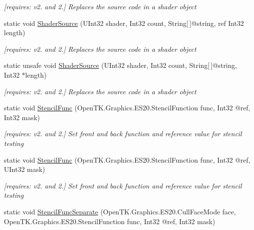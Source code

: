 \begin{DoxyCompactItemize}
\begin{DoxyCompactList}\small\item\em \mbox{[}requires\-: v2. and 2.\mbox{]} Replaces the source code in a shader object \end{DoxyCompactList}\item 
static void \hyperlink{class_open_t_k_1_1_graphics_1_1_e_s20_1_1_g_l_aa06ba894a1916266cdcb35c84ddce259}{Shader\-Source} (U\-Int32 shader, Int32 count, String\mbox{[}$\,$\mbox{]}@string, ref Int32 length)
\begin{DoxyCompactList}\small\item\em \mbox{[}requires\-: v2. and 2.\mbox{]} Replaces the source code in a shader object \end{DoxyCompactList}\item 
static unsafe void \hyperlink{class_open_t_k_1_1_graphics_1_1_e_s20_1_1_g_l_a2eb72d4c5ae1aa4f46b5740cafb5ed4a}{Shader\-Source} (U\-Int32 shader, Int32 count, String\mbox{[}$\,$\mbox{]}@string, Int32 $\ast$length)
\begin{DoxyCompactList}\small\item\em \mbox{[}requires\-: v2. and 2.\mbox{]} Replaces the source code in a shader object \end{DoxyCompactList}\item 
static void \hyperlink{class_open_t_k_1_1_graphics_1_1_e_s20_1_1_g_l_aa7bbcab167db0c56852af17f011c4f8f}{Stencil\-Func} (Open\-T\-K.\-Graphics.\-E\-S20.\-Stencil\-Function func, Int32 @ref, Int32 mask)
\begin{DoxyCompactList}\small\item\em \mbox{[}requires\-: v2. and 2.\mbox{]} Set front and back function and reference value for stencil testing \end{DoxyCompactList}\item 
static void \hyperlink{class_open_t_k_1_1_graphics_1_1_e_s20_1_1_g_l_a04521797272b6e82c48a51424564ccf6}{Stencil\-Func} (Open\-T\-K.\-Graphics.\-E\-S20.\-Stencil\-Function func, Int32 @ref, U\-Int32 mask)
\begin{DoxyCompactList}\small\item\em \mbox{[}requires\-: v2. and 2.\mbox{]} Set front and back function and reference value for stencil testing \end{DoxyCompactList}\item 
static void \hyperlink{class_open_t_k_1_1_graphics_1_1_e_s20_1_1_g_l_aff44f1b38eda0c936e0b74d518b74fc1}{Stencil\-Func\-Separate} (Open\-T\-K.\-Graphics.\-E\-S20.\-Cull\-Face\-Mode face, Open\-T\-K.\-Graphics.\-E\-S20.\-Stencil\-Function func, Int32 @ref, Int32 mask)

\end{DoxyCompactItemize}

